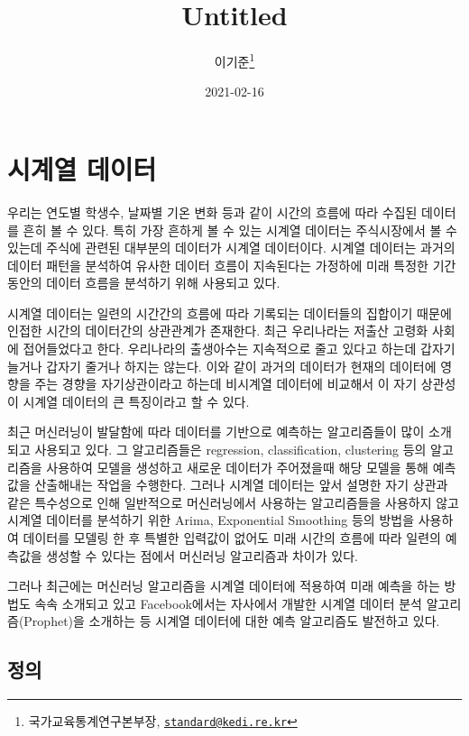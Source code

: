 \documentclass[
]{book}
\title{Untitled}
\author{이기준\footnote{국가교육통계연구본부장, \href{mailto:standard@kedi.re.kr}{\nolinkurl{standard@kedi.re.kr}}}}
\date{2021-02-16}
\begin{document}
\maketitle

{
\setcounter{tocdepth}{1}
\tableofcontents
}
\hypertarget{uxc2dcuxacc4uxc5f4-uxb370uxc774uxd130}{%
\chapter{시계열 데이터}\label{uxc2dcuxacc4uxc5f4-uxb370uxc774uxd130}}

우리는 연도별 학생수, 날짜별 기온 변화 등과 같이 시간의 흐름에 따라 수집된 데이터를 흔히 볼 수 있다. 특히 가장 흔하게 볼 수 있는 시계열 데이터는 주식시장에서 볼 수 있는데 주식에 관련된 대부분의 데이터가 시계열 데이터이다. 시계열 데이터는 과거의 데이터 패턴을 분석하여 유사한 데이터 흐름이 지속된다는 가정하에 미래 특정한 기간동안의 데이터 흐름을 분석하기 위해 사용되고 있다.

시계열 데이터는 일련의 시간간의 흐름에 따라 기록되는 데이터들의 집합이기 때문에 인접한 시간의 데이터간의 상관관계가 존재한다. 최근 우리나라는 저출산 고령화 사회에 접어들었다고 한다. 우리나라의 출생아수는 지속적으로 줄고 있다고 하는데 갑자기 늘거나 갑자기 줄거나 하지는 않는다. 이와 같이 과거의 데이터가 현재의 데이터에 영향을 주는 경향을 자기상관이라고 하는데 비시계열 데이터에 비교해서 이 자기 상관성이 시계열 데이터의 큰 특징이라고 할 수 있다.

최근 머신러닝이 발달함에 따라 데이터를 기반으로 예측하는 알고리즘들이 많이 소개되고 사용되고 있다. 그 알고리즘들은 regression, classification, clustering 등의 알고리즘을 사용하여 모델을 생성하고 새로운 데이터가 주어졌을때 해당 모델을 통해 예측 값을 산출해내는 작업을 수행한다. 그러나 시계열 데이터는 앞서 설명한 자기 상관과 같은 특수성으로 인해 일반적으로 머신러닝에서 사용하는 알고리즘들을 사용하지 않고 시계열 데이터를 분석하기 위한 Arima, Exponential Smoothing 등의 방법을 사용하여 데이터를 모델링 한 후 특별한 입력값이 없어도 미래 시간의 흐름에 따라 일련의 예측값을 생성할 수 있다는 점에서 머신러닝 알고리즘과 차이가 있다.

그러나 최근에는 머신러닝 알고리즘을 시계열 데이터에 적용하여 미래 예측을 하는 방법도 속속 소개되고 있고 Facebook에서는 자사에서 개발한 시계열 데이터 분석 알고리즘(Prophet)을 소개하는 등 시계열 데이터에 대한 예측 알고리즘도 발전하고 있다.

\hypertarget{uxc815uxc758}{%
\section{정의}\label{uxc815uxc758}}
\end{document}
